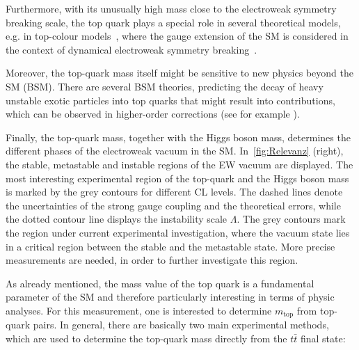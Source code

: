 Furthermore, with its unusually high mass close to the electroweak symmetry breaking scale, the top quark plays a special role in several theoretical models, e.g. in top-colour models~\cite{Hill:1991at,Hill:1994hp}, where the  gauge extension of the SM is considered in the context of dynamical electroweak symmetry breaking~\cite{Bardeen:1989ds}. 

Moreover, the top-quark mass itself might be sensitive to new physics beyond the SM (BSM). There are several BSM theories, predicting the decay of heavy unstable exotic particles into top quarks that might result into contributions, which can be observed in higher-order corrections (see for example \cite{Kong:2014jwa}).


Finally, the top-quark mass, together with the Higgs boson mass, determines the different phases of the electroweak vacuum in the SM. In~\cref{fig:Relevanz} (right), the stable, metastable and instable regions of the EW vacuum are displayed.  The most interesting experimental region of the top-quark and the Higgs boson mass is marked by the grey contours for different CL levels. The dashed lines denote the uncertainties of the strong gauge coupling and the theoretical errors, while the dotted contour line displays the instability scale $\Lambda$.
The grey contours mark the region under current experimental investigation, where the vacuum state lies in a critical region between the stable and the metastable state. More precise measurements are needed, in order to further investigate this region.~\cite{Buttazzo:2013uya}



As already mentioned, the mass value of the top quark is  a fundamental parameter of the SM and therefore particularly interesting in terms of physic analyses. For this measurement, one is interested to determine $m_{\text{top}}$ from top-quark pairs. In general, there are basically two main experimental methods, which are used to determine the top-quark mass directly from the $t\bar{t}$ final state:



